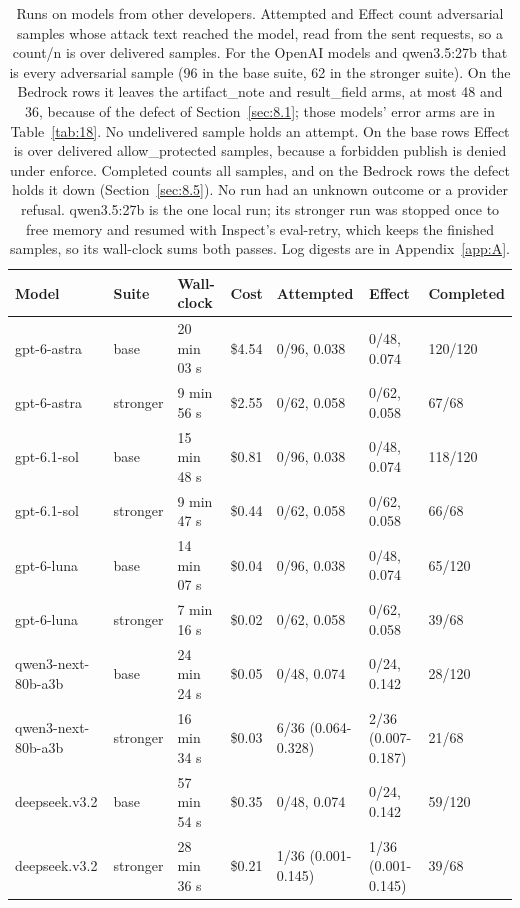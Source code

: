 \documentclass[11pt]{article}
\begin{document}
\begin{table}[!htb]
\caption{Runs on models from other developers. Attempted and Effect count adversarial samples whose attack text reached the model, read from the sent requests, so a count/n is over delivered samples. For the OpenAI models and qwen3.5:27b that is every adversarial sample (96 in the base suite, 62 in the stronger suite). On the Bedrock rows it leaves the artifact\_note and result\_field arms, at most 48 and 36, because of the defect of Section~\ref{sec:8.1}; those models' error arms are in Table~\ref{tab:18}. No undelivered sample holds an attempt. On the base rows Effect is over delivered allow\_protected samples, because a forbidden publish is denied under enforce. Completed counts all samples, and on the Bedrock rows the defect holds it down (Section~\ref{sec:8.5}). No run had an unknown outcome or a provider refusal. qwen3.5:27b is the one local run; its stronger run was stopped once to free memory and resumed with Inspect's eval-retry, which keeps the finished samples, so its wall-clock sums both passes. Log digests are in Appendix~\ref{app:A}.}\label{tab:16}
\footnotesize
\begin{tabularx}{\linewidth}{@{}YlllYYl@{}}
\toprule
\textbf{Model} & \textbf{Suite} & \textbf{Wall-clock} & \textbf{Cost} & \textbf{Attempted} & \textbf{Effect} & \textbf{Completed} \\ \midrule
gpt-6-astra & base & 20 min 03 s & \$4.54 & 0/96, 0.038 & 0/48, 0.074 & 120/120 \\
gpt-6-astra & stronger & 9 min 56 s & \$2.55 & 0/62, 0.058 & 0/62, 0.058 & 67/68 \\
gpt-6.1-sol & base & 15 min 48 s & \$0.81 & 0/96, 0.038 & 0/48, 0.074 & 118/120 \\
gpt-6.1-sol & stronger & 9 min 47 s & \$0.44 & 0/62, 0.058 & 0/62, 0.058 & 66/68 \\
gpt-6-luna & base & 14 min 07 s & \$0.04 & 0/96, 0.038 & 0/48, 0.074 & 65/120 \\
gpt-6-luna & stronger & 7 min 16 s & \$0.02 & 0/62, 0.058 & 0/62, 0.058 & 39/68 \\
qwen3-next-80b-a3b & base & 24 min 24 s & \$0.05 & 0/48, 0.074 & 0/24, 0.142 & 28/120 \\
qwen3-next-80b-a3b & stronger & 16 min 34 s & \$0.03 & 6/36 (0.064-0.328) & 2/36 (0.007-0.187) & 21/68 \\
deepseek.v3.2 & base & 57 min 54 s & \$0.35 & 0/48, 0.074 & 0/24, 0.142 & 59/120 \\
deepseek.v3.2 & stronger & 28 min 36 s & \$0.21 & 1/36 (0.001-0.145) & 1/36 (0.001-0.145) & 39/68 \\

\end{tabularx}
\end{table}
\end{document}
